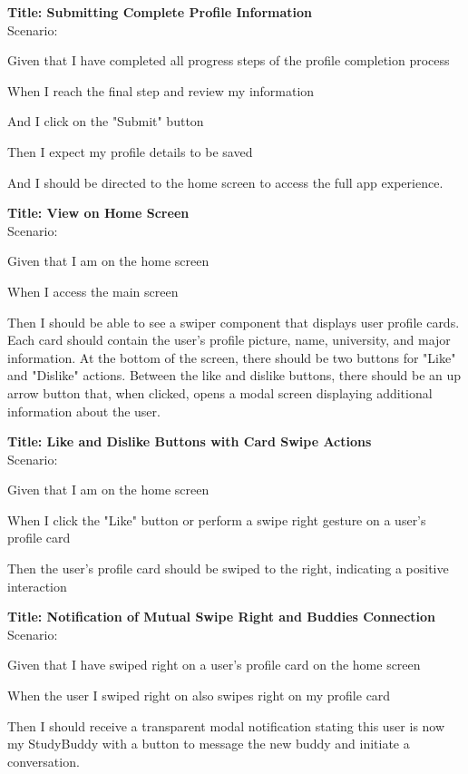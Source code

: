\bigskip
\textbf{Title: Submitting Complete Profile Information} \\
Scenario:
\begin{compactitem}
    \item Given that I have completed all progress steps of the profile completion process
    \item When I reach the final step and review my information
    \item And I click on the "Submit" button
    \item Then I expect my profile details to be saved
    \item And I should be directed to the home screen to access the full app experience.
\end{compactitem}

\bigskip
\textbf{Title: View on Home Screen} \\
Scenario:
\begin{compactitem}
    \item Given that I am on the home screen
    \item When I access the main screen
    \item Then I should be able to see a swiper component that displays user profile cards. Each card should contain the user's profile picture, name, university, and major information. At the bottom of the screen, there should be two buttons for "Like" and "Dislike" actions. Between the like and dislike buttons, there should be an up arrow button that, when clicked, opens a modal screen displaying additional information about the user.
\end{compactitem}

\bigskip
\textbf{Title: Like and Dislike Buttons with Card Swipe Actions} \\
Scenario:
\begin{compactitem}
    \item Given that I am on the home screen
    \item When I click the "Like" button or perform a swipe right gesture on a user's profile card
    \item Then the user's profile card should be swiped to the right, indicating a positive interaction
\end{compactitem}

\bigskip
\textbf{Title: Notification of Mutual Swipe Right and Buddies Connection} \\
Scenario:
\begin{compactitem}
    \item Given that I have swiped right on a user's profile card on the home screen
    \item When the user I swiped right on also swipes right on my profile card
    \item Then I should receive a transparent modal notification stating this user is now my StudyBuddy with a button to message the new buddy and initiate a conversation.
\end{compactitem}


